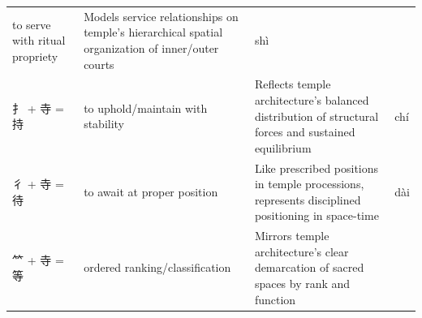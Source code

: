 \begin{longtable}[]{@{}llll@{}}
\begin{minipage}[t]{0.14\columnwidth}
to serve with ritual propriety\strut
\end{minipage} & \begin{minipage}[t]{0.45\columnwidth}\raggedright
Models service relationships on temple's hierarchical spatial
organization of inner/outer courts\strut
\end{minipage} & \begin{minipage}[t]{0.14\columnwidth}\raggedright
shì\strut
\end{minipage}\tabularnewline
\begin{minipage}[t]{0.14\columnwidth}\raggedright
扌 + 寺 = 持\strut
\end{minipage} & \begin{minipage}[t]{0.14\columnwidth}\raggedright
to uphold/maintain with stability\strut
\end{minipage} & \begin{minipage}[t]{0.45\columnwidth}\raggedright
Reflects temple architecture's balanced distribution of structural
forces and sustained equilibrium\strut
\end{minipage} & \begin{minipage}[t]{0.14\columnwidth}\raggedright
chí\strut
\end{minipage}\tabularnewline
\begin{minipage}[t]{0.14\columnwidth}\raggedright
彳 + 寺 = 待\strut
\end{minipage} & \begin{minipage}[t]{0.14\columnwidth}\raggedright
to await at proper position\strut
\end{minipage} & \begin{minipage}[t]{0.45\columnwidth}\raggedright
Like prescribed positions in temple processions, represents disciplined
positioning in space-time\strut
\end{minipage} & \begin{minipage}[t]{0.14\columnwidth}\raggedright
dài\strut
\end{minipage}\tabularnewline
\begin{minipage}[t]{0.14\columnwidth}\raggedright
⺮ + 寺 = 等\strut
\end{minipage} & \begin{minipage}[t]{0.14\columnwidth}\raggedright
ordered ranking/classification\strut
\end{minipage} & \begin{minipage}[t]{0.45\columnwidth}\raggedright
Mirrors temple architecture's clear demarcation of sacred spaces by rank
and function\strut
\end{minipage} & \begin{minipage}[t]{0.14\columnwidth}\raggedright

\end{minipage}
\end{longtable}

